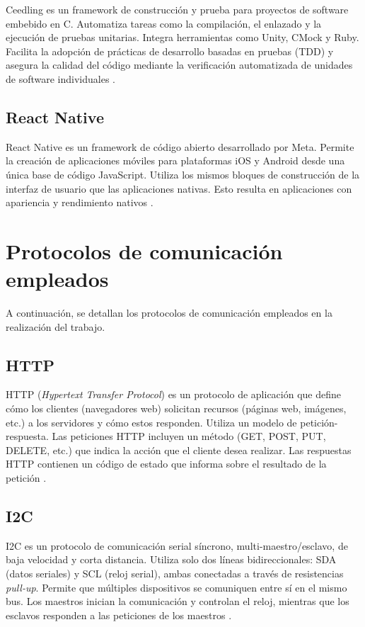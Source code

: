 Ceedling es un framework de construcción y prueba para proyectos de software embebido en C. Automatiza tareas como la compilación, el enlazado y la ejecución de pruebas unitarias. Integra herramientas como Unity, CMock y Ruby. Facilita la adopción de prácticas de desarrollo basadas en pruebas (TDD) y asegura la calidad del código mediante la verificación automatizada de unidades de software individuales \cite{CEEDLING}.

\subsection{React Native}
React Native es un framework de código abierto desarrollado por Meta. Permite la creación de aplicaciones móviles para plataformas iOS y Android desde una única base de código JavaScript. Utiliza los mismos bloques de construcción de la interfaz de usuario que las aplicaciones nativas. Esto resulta en aplicaciones con apariencia y rendimiento nativos \cite{reactnative}.

\section{Protocolos de comunicación empleados}

A continuación, se detallan los protocolos de comunicación empleados en la realización del trabajo.

\subsection{HTTP}
HTTP (\textit{Hypertext Transfer Protocol}) es un protocolo de aplicación que define cómo los clientes (navegadores web) solicitan recursos (páginas web, imágenes, etc.) a los servidores y cómo estos responden. Utiliza un modelo de petición-respuesta. Las peticiones HTTP incluyen un método (GET, POST, PUT, DELETE, etc.) que indica la acción que el cliente desea realizar. Las respuestas HTTP contienen un código de estado que informa sobre el resultado de la petición \cite{HTTP}.

\subsection{I2C}
I2C es un protocolo de comunicación serial síncrono, multi-maestro/esclavo, de baja velocidad y corta distancia. Utiliza solo dos líneas bidireccionales: SDA (datos seriales) y SCL (reloj serial), ambas conectadas a través de resistencias \textit{pull-up}. Permite que múltiples dispositivos se comuniquen entre sí en el mismo bus. Los maestros inician la comunicación y controlan el reloj, mientras que los esclavos responden a las peticiones de los maestros \cite{I2C}.


